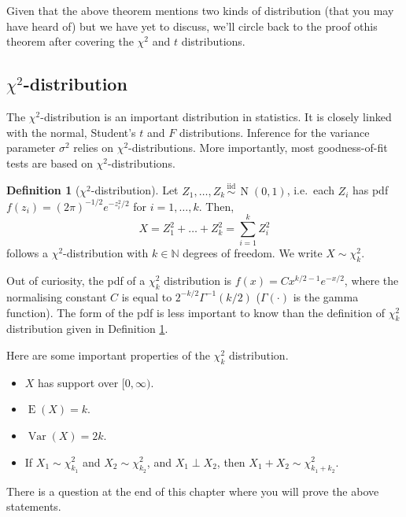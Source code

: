 \documentclass[
]{book}
\providecommand{\tightlist}{%
  \setlength{\itemsep}{0pt}\setlength{\parskip}{0pt}}
\DeclareMathOperator{\E}{E}
\DeclareMathOperator{\Var}{Var}
\DeclareMathOperator{\N}{N}
\newcommand{\iid}{\,\overset{\text{iid}}{\sim}\,}
\newcommand{\bbN}{\mathbb{N}}
\theoremstyle{definition}
\newtheorem{definition}{Definition}[chapter]
\theoremstyle{definition}
\theoremstyle{definition}
\theoremstyle{definition}
\theoremstyle{remark}
\begin{document}
Given that the above theorem mentions two kinds of distribution (that you may have heard of) but we have yet to discuss, we'll circle back to the proof othis theorem after covering the \(\chi^2\) and \(t\) distributions.

\hypertarget{chi2-distribution}{%
\subsection{\texorpdfstring{\(\chi^2\)-distribution}{\textbackslash chi\^{}2-distribution}}\label{chi2-distribution}}

The \(\chi^2\)-distribution is an important distribution in statistics.
It is closely linked with the normal, Student's \(t\) and \(F\) distributions. Inference for the variance parameter \(\sigma^2\) relies on \(\chi^2\)-distributions.
More importantly, most goodness-of-fit tests are based on \(\chi^2\)-distributions.

\begin{definition}[$\chi^2$-distribution]
\protect\hypertarget{def:chisq}{}\label{def:chisq}Let \(Z_1,\dots,Z_k \iid \N(0,1)\), i.e.~each \(Z_i\) has pdf \(f(z_i) = (2\pi)^{-1/2}e^{-z_i^2/2}\) for \(i=1,\dots,k\).
Then,
\[X = Z_1^2 + \dots + Z_k^2 = \sum_{i=1}^k Z_i^2\]
follows a \(\chi^2\)-distribution with \(k\in\bbN\) degrees of freedom.
We write
\(X \sim \chi^2_k\).
\end{definition}

Out of curiosity, the pdf of a \(\chi^2_k\) distribution is \(f(x) = Cx^{k/2-1}e^{-x/2}\), where the normalising constant \(C\) is equal to \(2^{-k/2}\Gamma^{-1}(k/2)\) (\(\Gamma(\cdot)\) is the gamma function).
The form of the pdf is less important to know than the definition of \(\chi^2_k\) distribution given in Definition \ref{def:chisq}.

Here are some important properties of the \(\chi^2_k\) distribution.

\begin{itemize}
\tightlist
\item
  \(X\) has support over \([0,\infty)\).
\item
  \(\E(X)=k\).
\item
  \(\Var(X) = 2k\).
\item
  If \(X_1\sim\chi^2_{k_1}\) and \(X_2\sim\chi^2_{k_2}\), and
  \(X_1 \perp X_2\), then \(X_1+X_2\sim \chi^2_{k_1+k_2}\).
\end{itemize}

There is a question at the end of this chapter where you will prove the above statements.
\end{document}
